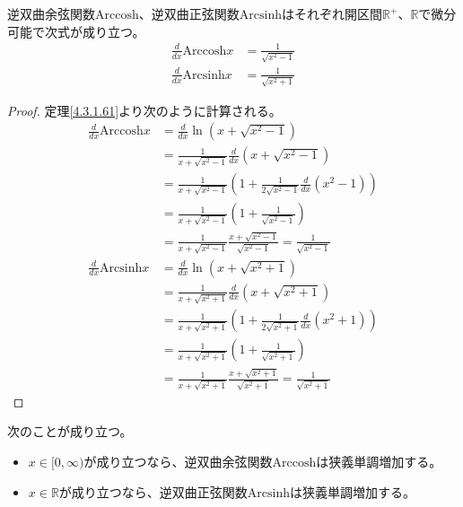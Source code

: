 \documentclass[dvipdfmx]{jsarticle}
\begin{document}
\begin{thm}\label{4.3.1.62}
逆双曲余弦関数$\mathrm{Arccosh}$、逆双曲正弦関数$\mathrm{Arcsinh}$はそれぞれ開区間$\mathbb{R}^{+}$、$\mathbb{R}$で微分可能で次式が成り立つ。
\begin{align*}
\frac{d}{dx}{\mathrm{Arccosh}}x &= \frac{1}{\sqrt{x^{2} - 1}}\\
\frac{d}{dx}{\mathrm{Arcsinh}}x &= \frac{1}{\sqrt{x^{2} + 1}}
\end{align*}
\end{thm}
\begin{proof} 定理\ref{4.3.1.61}より次のように計算される。
\begin{align*}
\frac{d}{dx}{\mathrm{Arccosh}}x &= \frac{d}{dx}\ln\left( x + \sqrt{x^{2} - 1} \right)\\
&= \frac{1}{x + \sqrt{x^{2} - 1}}\frac{d}{dx}\left( x + \sqrt{x^{2} - 1} \right)\\
&= \frac{1}{x + \sqrt{x^{2} - 1}}\left( 1 + \frac{1}{2\sqrt{x^{2} - 1}}\frac{d}{dx}\left( x^{2} - 1 \right) \right)\\
&= \frac{1}{x + \sqrt{x^{2} - 1}}\left( 1 + \frac{1}{\sqrt{x^{2} - 1}} \right)\\
&= \frac{1}{x + \sqrt{x^{2} - 1}}\frac{x + \sqrt{x^{2} - 1}}{\sqrt{x^{2} - 1}} = \frac{1}{\sqrt{x^{2} - 1}}\\
\frac{d}{dx}{\mathrm{Arcsinh}}x &= \frac{d}{dx}\ln\left( x + \sqrt{x^{2} + 1} \right)\\
&= \frac{1}{x + \sqrt{x^{2} + 1}}\frac{d}{dx}\left( x + \sqrt{x^{2} + 1} \right)\\
&= \frac{1}{x + \sqrt{x^{2} + 1}}\left( 1 + \frac{1}{2\sqrt{x^{2} + 1}}\frac{d}{dx}\left( x^{2} + 1 \right) \right)\\
&= \frac{1}{x + \sqrt{x^{2} + 1}}\left( 1 + \frac{1}{\sqrt{x^{2} + 1}} \right)\\
&= \frac{1}{x + \sqrt{x^{2} + 1}}\frac{x + \sqrt{x^{2} + 1}}{\sqrt{x^{2} + 1}} = \frac{1}{\sqrt{x^{2} + 1}}
\end{align*}
\end{proof}
\begin{thm}\label{4.3.1.63}次のことが成り立つ。
\begin{itemize}
\item
  $x \in [ 0,\infty)$が成り立つなら、逆双曲余弦関数$\mathrm{Arccosh}$は狭義単調増加する。
\item
  $x \in \mathbb{R}$が成り立つなら、逆双曲正弦関数$\mathrm{Arcsinh}$は狭義単調増加する。
\end{itemize}
\end{thm}
\end{document}
